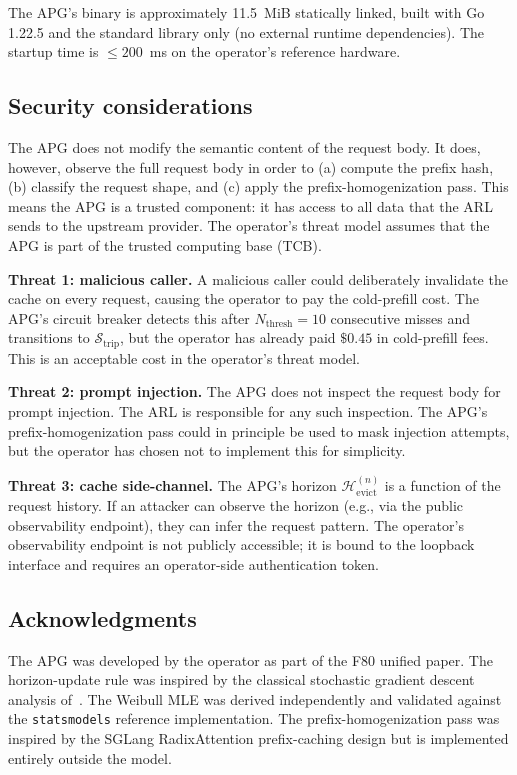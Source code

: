 The APG's binary is approximately 11.5~MiB statically linked,
built with Go 1.22.5 and the standard library only (no
external runtime dependencies). The startup time is
$\le 200$~ms on the operator's reference hardware.

\subsection{Security considerations}
\label{app:apg:security}

The APG does not modify the semantic content of the request
body. It does, however, observe the full request body in order
to (a) compute the prefix hash, (b) classify the request shape,
and (c) apply the prefix-homogenization pass. This means the
APG is a trusted component: it has access to all data that the
ARL sends to the upstream provider. The operator's threat model
assumes that the APG is part of the trusted computing base
(TCB).

\noindent
\textbf{Threat 1: malicious caller.} A malicious caller could
deliberately invalidate the cache on every request, causing
the operator to pay the cold-prefill cost. The APG's circuit
breaker detects this after $N_{\text{thresh}} = 10$ consecutive
misses and transitions to $\mathcal{S}_{\text{trip}}$, but the
operator has already paid $\$0.45$ in cold-prefill fees. This
is an acceptable cost in the operator's threat model.

\noindent
\textbf{Threat 2: prompt injection.} The APG does not inspect
the request body for prompt injection. The ARL is responsible
for any such inspection. The APG's prefix-homogenization pass
could in principle be used to mask injection attempts, but the
operator has chosen not to implement this for simplicity.

\noindent
\textbf{Threat 3: cache side-channel.} The APG's horizon
$\mathcal{H}_{\text{evict}}^{(n)}$ is a function of the
request history. If an attacker can observe the horizon (e.g.,
via the public observability endpoint), they can infer the
request pattern. The operator's observability endpoint is
not publicly accessible; it is bound to the loopback interface
and requires an operator-side authentication token.

\subsection{Acknowledgments}
\label{app:apg:ack}

The APG was developed by the operator as part of the F80
unified paper. The horizon-update rule was inspired by the
classical stochastic gradient descent analysis of~\cite{bottou2018}.
The Weibull MLE was derived independently and validated against
the \texttt{statsmodels} reference implementation.
The prefix-homogenization pass was inspired by the SGLang
RadixAttention prefix-caching design but is implemented
entirely outside the model.

